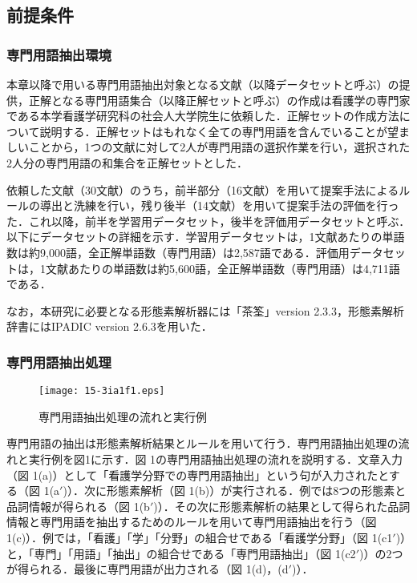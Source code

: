 \documentclass[japanese]{jnlp_1.4}
\begin{document}
\subsection{前提条件}

\subsubsection{専門用語抽出環境}

本章以降で用いる専門用語抽出対象となる文献（以降データセットと呼ぶ）の提供，正解となる専門用語集合（以降正解セットと呼ぶ）の作成は看護学の専門家である本学看護学研究科の社会人大学院生に依頼した．正解セットの作成方法について説明する．正解セットはもれなく全ての専門用語を含んでいることが望ましいことから，1つの文献に対して2人が専門用語の選択作業を行い，選択された2人分の専門用語の和集合を正解セットとした．

依頼した文献（30文献）のうち，前半部分（16文献）を用いて提案手法によるルールの導出と洗練を行い，残り後半（14文献）を用いて提案手法の評価を行った．これ以降，前半を学習用データセット，後半を評価用データセットと呼ぶ．以下にデータセットの詳細を示す．学習用データセットは，1文献あたりの単語数は約9,000語，全正解単語数（専門用語）は2,587語である．評価用データセットは，1文献あたりの単語数は約5,600語，全正解単語数（専門用語）は4,711語である．

なお，本研究に必要となる形態素解析器には「茶筌」version 2.3.3，形態素解析辞書にはIPADIC version 2.6.3を用いた．

\subsubsection{専門用語抽出処理}

\begin{figure}[b]
\begin{center}
\texttt{[image: 15-3ia1f1.eps]}
\end{center}
\caption{専門用語抽出処理の流れと実行例}
\end{figure}

専門用語の抽出は形態素解析結果とルールを用いて行う．専門用語抽出処理の流れと実行例を図1に示す．図 1の専門用語抽出処理の流れを説明する．文章入力（図 1(a)）として「看護学分野での専門用語抽出」という句が入力されたとする（図 1(a$'$)）．次に形態素解析（図 1(b)）が実行される．例では8つの形態素と品詞情報が得られる（図 1(b$'$)）．その次に形態素解析の結果として得られた品詞情報と専門用語を抽出するためのルールを用いて専門用語抽出を行う（図 1(c)）．例では，「看護」「学」「分野」の組合せである「看護学分野」（図 1(c1$'$)）と，「専門」「用語」「抽出」の組合せである「専門用語抽出」（図 1(c2$'$)）の2つが得られる．最後に専門用語が出力される（図 1(d)，(d$'$)）．
\end{document}
